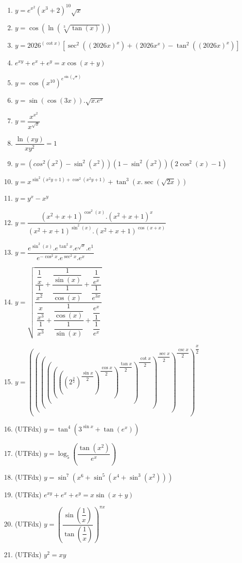 \documentclass[12pt]{article}
\begin{document}
\begin{enumerate}
			\item $y=e^{x^{2}}(x^{3}+2)^{10}\sqrt{x}$
			\item $y=\cos (\ln (\sqrt[3]{\tan (x)}))$
			\item $y=2026^{(\cot x)}\left[ \sec^{2}((2026x)^{x})+(2026x^{x})-\tan^{2}((2026x)^{x}) \right]$
			\item $e^{xy}+e^{x}+e^{y}=x\cos(x+y)$
			\item $y=\cos(x^{10})^{e^{\sin(\sqrt{x})}}$
			\item $y=\sin(\cos(3x)).\sqrt{x.e^{x}}$
			\item $y=\dfrac{x^{x^{2}}}{x^{\sqrt{x}}}$
			\item $\dfrac{\ln(xy)}{xy^{2}}=1$
			\item $y=(cos^{2}(x^{2})-\sin^{2}(x^{2}))(1-\sin^{2}(x^{2}))(2\cos^{2}(x)-1)$
			\item $y=x^{\sin^{2}(x^{2}y+1)+\cos^{2}(x^{2}y+1)}+\tan^{3}(x.\sec(\sqrt{2x}))$
			\item $y=y^{x}-x^{y}$
			\item $y=\dfrac{(x^{2}+x+1)^{\cos^{2}(x)}.(x^{2}+x+1)^{x}}{(x^{2}+x+1)^{\sin^{2}(x)}.(x^{2}+x+1)^{\cos(x+x)}}$
			\item $y=\dfrac{e^{\sin^{2}(x)}.e^{\tan^{2}x}.e^{\sqrt{x}}.e^{1}}{e^{-\cos^{2}x}.e^{\sec^{2}x}.e^{x}}$
			\item $y=\sqrt{\dfrac{\dfrac{\dfrac{1}{x}}{\dfrac{1}{x^{2}}}+\dfrac{\dfrac{1}{\sin(x)}}{\dfrac{1}{\cos(x)}}+\dfrac{\dfrac{1}{e^{x}}}{\dfrac{1}{e^{3x}}}}{\dfrac{\dfrac{x}{x^{3}}}{\dfrac{1}{x^{3}}}+\dfrac{\dfrac{1}{\cos(x)}}{\dfrac{1}{\sin(x)}}+\dfrac{\dfrac{e^{x}}{1}}{\dfrac{1}{e^{x}}}}}$
			\item $y=\left( \left( \left( \left( \left( \left( \left(2^{\frac{3}{2}}\right)^{\dfrac{\sin x}{2}}\right)^{\dfrac{\cos x}{2}} \right)^{\dfrac{\tan x}{2}}\right)^{\dfrac{\cot x}{2}} \right)^{\dfrac{\sec x}{2}}\right)^{\dfrac{\csc x}{2}}\right)^{\dfrac{x}{2}}$
			\item (UTFdx) $y=\tan^{4}(3^{\sin x}+\tan (e^{x}))$
			\item (UTFdx) $y=\log_{5}\left( \dfrac{\tan(x^{2})}{e^{x}} \right)$
			\item (UTFdx) $y=\sin^{7}(x^{6}+\sin^{5}(x^{4}+\sin^{3}(x^{2})))$
			\item (UTFdx) $e^{xy}+e^{x}+e^{y}=x\sin(x+y)$
			\item (UTFdx) $y=\left( \dfrac{\sin \left( \dfrac{1}{x} \right) }{\tan \left( \dfrac{1}{x} \right) }\right)^{\pi x} $
			\item (UTFdx) $y^{2}=xy$
			

\end{enumerate}
\end{document}
